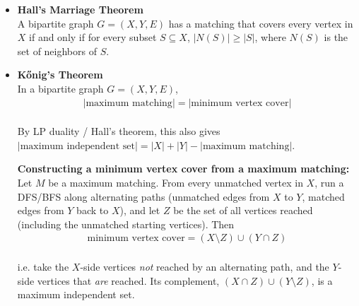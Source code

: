 \begin{itemize}
    \item \textbf{Hall's Marriage Theorem} \\
    A bipartite graph $G=(X, Y, E)$ has a matching that covers every vertex in $X$ if and only if
    for every subset $S \subseteq X$, $|N(S)| \geq |S|$, where $N(S)$ is the set of neighbors of $S$.

    \item \textbf{K\H{o}nig's Theorem} \\
    In a bipartite graph $G=(X, Y, E)$,
    \begin{equation*}
    \begin{aligned}
    |\text{maximum matching}| = |\text{minimum vertex cover}|
    \end{aligned}
    \end{equation*} \\
    By LP duality / Hall's theorem, this also gives $|\text{maximum independent set}| = |X|+|Y| - |\text{maximum matching}|$.

    \textbf{Constructing a minimum vertex cover from a maximum matching:} \\
    Let $M$ be a maximum matching. From every unmatched vertex in $X$, run a DFS/BFS along
    alternating paths (unmatched edges from $X$ to $Y$, matched edges from $Y$ back to $X$),
    and let $Z$ be the set of all vertices reached (including the unmatched starting vertices). Then
    \begin{equation*}
    \begin{aligned}
    \text{minimum vertex cover} = (X \setminus Z) \cup (Y \cap Z)
    \end{aligned}
    \end{equation*} \\
    i.e. take the $X$-side vertices \emph{not} reached by an alternating path, and the $Y$-side
    vertices that \emph{are} reached. Its complement, $(X \cap Z) \cup (Y \setminus Z)$, is a
    maximum independent set.


\end{itemize}
